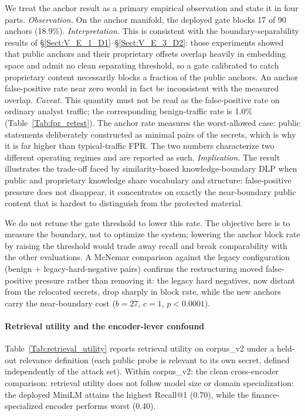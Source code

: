 \documentclass[journal]{IEEEtran}
\begin{document}
We treat the anchor result as a primary empirical observation and state it in
four parts.
\emph{Observation.} On the anchor manifold, the deployed gate blocks 17 of 90
anchors (18.9\%).
\emph{Interpretation.} This is consistent with the boundary-separability
results of \S\ref{Sect:V_E_1_D1}--\S\ref{Sect:V_E_3_D2}: those experiments
showed that public anchors and their proprietary offsets overlap heavily in
embedding space and admit no clean separating threshold, so a gate calibrated
to catch proprietary content necessarily blocks a fraction of the public
anchors. An anchor false-positive rate near zero would in fact be inconsistent
with the measured overlap.
\emph{Caveat.} This quantity must not be read as the false-positive rate on
ordinary analyst traffic; the corresponding benign-traffic rate is 1.0\%
(Table~\ref{Tab:fpr_retest}). The anchor rate measures the worst-allowed case:
public statements deliberately constructed as minimal pairs of the secrets,
which is why it is far higher than typical-traffic FPR. The two numbers
characterize two different operating regimes and are reported as such.
\emph{Implication.} The result illustrates the trade-off faced by
similarity-based knowledge-boundary DLP when public and proprietary knowledge
share vocabulary and structure: false-positive pressure does not disappear, it
concentrates on exactly the near-boundary public content that is hardest to
distinguish from the protected material.

We do not retune the gate threshold to lower this rate. The objective here is
to measure the boundary, not to optimize the system; lowering the anchor block
rate by raising the threshold would trade away recall and break comparability
with the other evaluations. A McNemar comparison against the legacy
configuration (benign $+$ legacy-hard-negative pairs) confirms the
restructuring moved false-positive pressure rather than removing it: the legacy
hard negatives, now distant from the relocated secrets, drop sharply in block
rate, while the new anchors carry the near-boundary cost ($b{=}27$, $c{=}1$,
$p<0.0001$).

\paragraph{Retrieval utility and the encoder-lever confound}
Table~\ref{Tab:retrieval_utility} reports retrieval utility on corpus\_v2 under
a held-out relevance definition (each public probe is relevant to its own
secret, defined independently of the attack set). Within corpus\_v2: the clean
cross-encoder comparison: retrieval utility does not follow model size or
domain specialization: the deployed MiniLM attains the highest Recall@1
(0.70), while the finance-specialized encoder performs worst (0.40).
\end{document}
